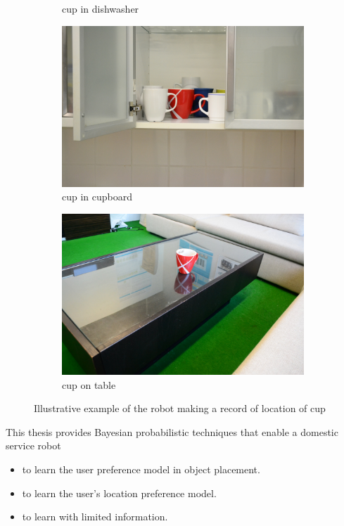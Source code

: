\begin{figure}[tp]
\begin{subfigure}{.243\textwidth}
    \caption{cup in dishwasher}
\end{subfigure}
\begin{subfigure}{.243\textwidth}
  \centering
  \includegraphics[width=\linewidth]{images/cup_cupboard.jpg}
    \caption{cup in cupboard}
\end{subfigure}
\begin{subfigure}{.243\textwidth}
  \centering
  \includegraphics[width=\linewidth]{images/cup_on_table.jpg}
    \caption{cup on table}
\end{subfigure}

\caption[Illustrative example of robot information collection]{Illustrative example of the robot making a record of location of cup}
\end{figure}

This thesis provides Bayesian probabilistic techniques that enable a domestic service robot
\begin{itemize}
	\item to learn the user preference model in object placement. 
	\item to learn the user's location preference model.
	\item to learn with limited information.
\end{itemize}



